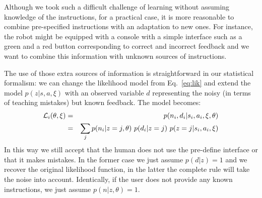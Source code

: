 Although we took such a difficult challenge of learning without assuming knowledge of the instructions, for a practical case, it is more reasonable to combine pre-specified instructions with an adaptation to new ones. For instance, the robot might be equipped with a console with a simple interface such as a green and a red button corresponding to correct and incorrect feedback and we want to combine this information with unknown sources of instructions.

The use of those extra sources of information is straightforward in our statistical formalism: we can change the likelihood model from Eq.~\ref{eq:lik} and extend the model $p(z|s,a,\xi)$ with an observed variable $d$ representing the noisy (in terms of teaching mistakes) but known feedback. The model becomes:
%
\begin{eqnarray}
\L_{i}(\theta, \xi) &=&  p(n_i,d_i|s_i,a_i,\xi,\theta)\nonumber\\
				&=&	\sum_{j} p(n_i|z = j,\theta)~p(d_i|z = j)~p(z = j|s_i,a_i,\xi)\nonumber\\
				\label{eq:lik2}
\end{eqnarray}
%
In this way we still accept that the human does not use the pre-define interface or that it makes mistakes. In the former case we just assume $p(d|z)=1$ and we recover the original likelihood function, in the latter the complete rule will take the noise into account. Identically, if the user does not provide any known instructions, we just assume $p(n|z,\theta)=1$.


